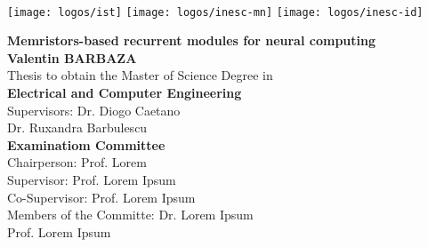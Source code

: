 \newcommand\blurredimage[3]{
  \node[opacity=0.2] at (#1) {\texttt{[image: \#3]}};
  \node[opacity=0.2] at (#1+ #2, #2) {\texttt{[image: \#3]}};
  \node[opacity=0.2] at (#1+-#2, #2) {\texttt{[image: \#3]}};
  \node[opacity=0.2] at (#1+-#2,-#2) {\texttt{[image: \#3]}};
  \node[opacity=0.2] at (#1+ #2,-#2) {\texttt{[image: \#3]}};
  }

  \setcounter{page}{1} 


  \thispagestyle{empty}

  \begin{flushleft}
    ~\\ \vspace{-12mm} \hspace{-12mm}
    \texttt{[image: logos/ist]}
    \hfill
    \texttt{[image: logos/inesc-mn]}
    \hfill
    \texttt{[image: logos/inesc-id]}
    \vspace{10mm}
    \\ \begin{center}
    \end{center} %

    \vspace{5mm}
    \centering
    \LARGE \textbf{Memristors-based recurrent modules for neural computing}
    \\ \vspace{15mm}
    \Large \textbf{Valentin BARBAZA} \\
    \vspace{12mm}
    \large Thesis to obtain the Master of Science Degree in
    \\ \vspace{2mm}
    \LARGE \textbf{Electrical and Computer Engineering}
    \\ \vspace{10mm}
    \large Supervisors: Dr. Diogo Caetano \\
    \large Dr. Ruxandra Barbulescu
    \\ \vspace{15mm}
    \Large \textbf{Examinatiom Committee}
    \\ \vspace{5mm}
    \large Chairperson: Prof. Lorem \\
    \large Supervisor: Prof. Lorem Ipsum\\
    \large Co-Supervisor: Prof. Lorem Ipsum \\
    \large Members of the Committe: Dr. Lorem Ipsum \\
    Prof. Lorem Ipsum


\end{flushleft}
